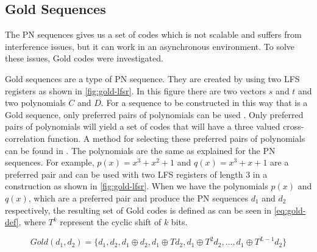 
\subsection{Gold Sequences}
\label{subsec:gold-sequences}

The PN sequences gives us a set of codes which is not scalable and suffers from interference issues, but it can work in an asynchronous environment.
To solve these issues, Gold codes were investigated.

Gold sequences are a type of PN sequence.
They are created by using two LFS registers as shown in \autoref{fig:gold-lfsr}.
In this figure there are two vectors $s$ and $t$ and two polynomials $C$ and $D$.
For a sequence to be constructed in this way that is a Gold sequence, only preferred pairs of polynomials can be used \cite{kedia2012comparative}.
Only preferred pairs of polynomials will yield a set of codes that will have a three valued cross-correlation function.
A method for selecting these preferred pairs of polynomials can be found in \cite{1054106}.
The polynomials are the same as explained for the PN sequences.
For example, $p(x) = x^3 + x^2 + 1$ and $q(x) = x^3 + x + 1$ are a preferred pair and can be used with two LFS registers of length $3$ in a construction as shown in \autoref{fig:gold-lfsr}.
When we have the polynomials $p(x)$ and $q(x)$, which are a preferred pair and produce the PN sequences $d_1$ and $d_2$ respectively, the resulting set of Gold codes is defined as can be seen in \autoref{eq:gold-def}, where $T^k$ represent the cyclic shift of $k$ bits.

\begin{equation}
	\label{eq:gold-def}
	Gold(d_1, d_2) = \{ d_1, d_2, d_1 \oplus d_2, d_1 \oplus Td_2, d_1 \oplus T^2d_2, \dotsc, d_1 \oplus T^{L - 1}d_2 \}
\end{equation}


